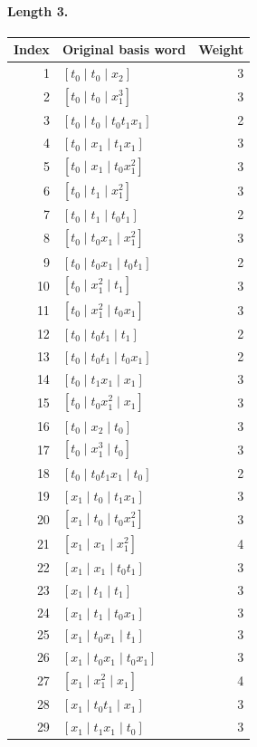\paragraph{Length 3.}
\begin{longtable}{r l r}
Index & Original basis word & Weight\\\hline
\endhead
1 & $[t_0\mid t_0\mid x_2]$ & 3\\
2 & $[t_0\mid t_0\mid x_1^{3}]$ & 3\\
3 & $[t_0\mid t_0\mid t_0 t_1 x_1]$ & 2\\
4 & $[t_0\mid x_1\mid t_1 x_1]$ & 3\\
5 & $[t_0\mid x_1\mid t_0 x_1^{2}]$ & 3\\
6 & $[t_0\mid t_1\mid x_1^{2}]$ & 3\\
7 & $[t_0\mid t_1\mid t_0 t_1]$ & 2\\
8 & $[t_0\mid t_0 x_1\mid x_1^{2}]$ & 3\\
9 & $[t_0\mid t_0 x_1\mid t_0 t_1]$ & 2\\
10 & $[t_0\mid x_1^{2}\mid t_1]$ & 3\\
11 & $[t_0\mid x_1^{2}\mid t_0 x_1]$ & 3\\
12 & $[t_0\mid t_0 t_1\mid t_1]$ & 2\\
13 & $[t_0\mid t_0 t_1\mid t_0 x_1]$ & 2\\
14 & $[t_0\mid t_1 x_1\mid x_1]$ & 3\\
15 & $[t_0\mid t_0 x_1^{2}\mid x_1]$ & 3\\
16 & $[t_0\mid x_2\mid t_0]$ & 3\\
17 & $[t_0\mid x_1^{3}\mid t_0]$ & 3\\
18 & $[t_0\mid t_0 t_1 x_1\mid t_0]$ & 2\\
19 & $[x_1\mid t_0\mid t_1 x_1]$ & 3\\
20 & $[x_1\mid t_0\mid t_0 x_1^{2}]$ & 3\\
21 & $[x_1\mid x_1\mid x_1^{2}]$ & 4\\
22 & $[x_1\mid x_1\mid t_0 t_1]$ & 3\\
23 & $[x_1\mid t_1\mid t_1]$ & 3\\
24 & $[x_1\mid t_1\mid t_0 x_1]$ & 3\\
25 & $[x_1\mid t_0 x_1\mid t_1]$ & 3\\
26 & $[x_1\mid t_0 x_1\mid t_0 x_1]$ & 3\\
27 & $[x_1\mid x_1^{2}\mid x_1]$ & 4\\
28 & $[x_1\mid t_0 t_1\mid x_1]$ & 3\\
29 & $[x_1\mid t_1 x_1\mid t_0]$ & 3\\

\end{longtable}
